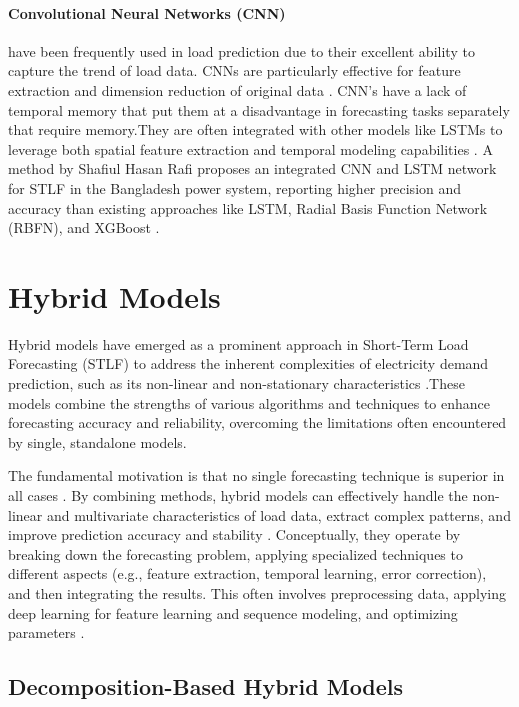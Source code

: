   \paragraph{Convolutional Neural Networks (CNN)} have been frequently used in load prediction due to their excellent ability to capture the trend of load data. CNNs are particularly effective for feature extraction and dimension reduction of original data \cite{hiceemdanQteg}. CNN's have a lack of temporal memory that put them at a disadvantage in forecasting tasks  separately that require memory.They are often integrated with other models like LSTMs to leverage both spatial feature extraction and temporal modeling capabilities \cite{rafi2021short}. A method by Shafiul Hasan Rafi proposes an integrated CNN and LSTM network for STLF in the Bangladesh power system, reporting higher precision and accuracy than existing approaches like LSTM, Radial Basis Function Network (RBFN), and XGBoost \cite{rafi2021short}.
 
 
 \section{ Hybrid Models } 
 
 Hybrid models have emerged as a prominent approach in Short-Term Load Forecasting (STLF) to address the inherent complexities of electricity demand prediction, such as its non-linear and non-stationary characteristics \cite{dong2021short}.These models combine the strengths of various algorithms and techniques to enhance forecasting accuracy and reliability, overcoming the limitations often encountered by single, standalone models.
 
 The fundamental motivation is that no single forecasting technique is superior in all cases \cite{li2023short}. By combining methods, hybrid models can effectively handle the non-linear and multivariate characteristics of load data, extract complex patterns, and improve prediction accuracy and stability \cite{li2023short}. Conceptually, they operate by breaking down the forecasting problem, applying specialized techniques to different aspects (e.g., feature extraction, temporal learning, error correction), and then integrating the results. This often involves preprocessing data, applying deep learning for feature learning and sequence modeling, and optimizing parameters \cite{kong2019improved}.
 
 \subsection{Decomposition-Based Hybrid Models } 
 
